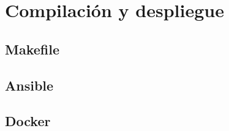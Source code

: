 \section{Compilación y despliegue}

\subsection{Makefile}

\subsection{Ansible}

\subsection{Docker}


